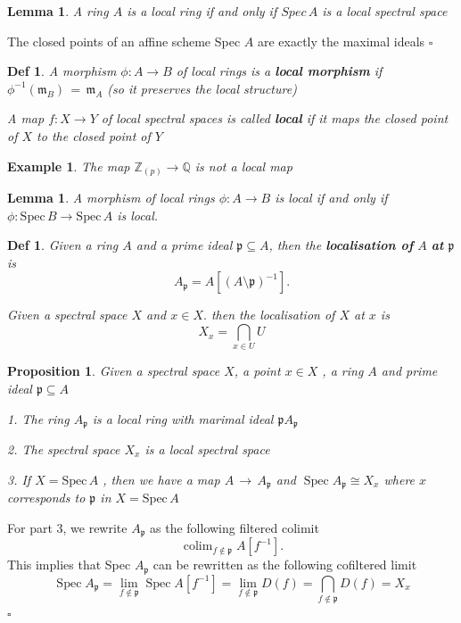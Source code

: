 \documentclass{article}
\newtheorem{definition}[theorem]{Def}
\newtheorem{lemma}[theorem]{Lemma}
\newtheorem{example}[theorem]{Example}
\newtheorem{proposition}[theorem]{Proposition}
\newenvironment{Proof}{{\noindent \indent \it Proof:\quad}}{\hfill $\square$\par}
\begin{document}
\begin{lemma}
     A ring $A$ is a local ring if and only if $Spec\, A$ is a local spectral space
\end{lemma}
\begin{Proof}
    The closed points of an affine scheme Spec $A$ are exactly the maximal ideals
\end{Proof}
\begin{definition}
    A morphism $\phi:{A} \rightarrow{B}$ of local rings is a \textbf{local morphism} if $\phi^{-1}({\mathfrak{m}}_{B})\,=\,{\mathfrak{m}}_{A}$ (so it preserves the local structure)
    
    A map $f:X\to Y$ of local spectral spaces is called \textbf{local} if it maps the closed point of $X$ to the closed point of $Y$ 
\end{definition}
\begin{example}
    The map $\mathbb Z_{(p)}\to \mathbb Q$ is not a local map
\end{example}
\begin{lemma}
    A morphism of local rings $\phi:A \rightarrow B$ is local if and only if $\phi:{\mathrm{Spec}}\,B\to{\mathrm{Spec}}\,A$ is local. 
\end{lemma}
\begin{definition}
    Given a ring $A$ and a prime ideal ${\mathfrak{p}}\subseteq A$, then the \textbf{localisation of} $A$ \textbf{at} $\mathfrak{p}$ is
$$
A_{\mathfrak{p}}=A[(A\setminus{\mathfrak{p}})^{-1}]. 
$$

Given a spectral space $X$ and $x\in X.$ then the localisation of  $X$ at $x$ is
$$
X_{x}=\bigcap_{x\in U}U 
$$
\end{definition}
\begin{proposition}
    Given a spectral space $X$, a point $x\in X$ , a ring $A$ and prime ideal $\mathfrak{p}\subseteq A$ 
    
    1. The ring $A_{\mathfrak{p}}$ is a local ring with marimal ideal ${\mathfrak{p}}A_{\mathfrak{p}}$ 
    
2. The spectral space $\textstyle X_{x}$ is a local spectral space

3. If $X={\mathrm{Spec}}\,A$ , then we have a map $A\, \rightarrow\,A_{\mathfrak{p}}$ and $\operatorname{Spec}A_{\mathfrak{p}}\cong X_{x}$ where $x$ corresponds to $\mathfrak{p}$ in $X={\mathrm{Spec}}\,A$ 
\end{proposition}
\begin{Proof}
    For part 3, we rewrite $A_{\mathfrak{p}}$ as the following filtered colimit
$$
\operatorname{colim}_{f\not\in{\mathfrak{p}}}A[f^{-1}]. 
$$
This implies that Spec $A_{\mathfrak{p}}$ can be rewritten as the following cofiltered limit
$$
\operatorname{Spec}A_{\mathfrak{p}}=\operatorname*{lim}_{f\notin{\mathfrak{p}}}\operatorname{Spec}A[f^{-1}]=\operatorname*{lim}_{f\notin{\mathfrak{p}}}D(f)=\bigcap_{f\notin{\mathfrak{p}}}D(f)=X_{x}
$$
\end{Proof}
\end{document}
